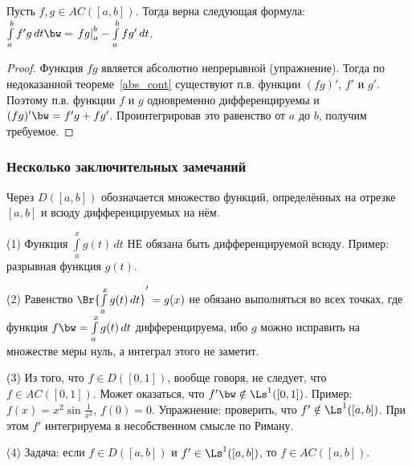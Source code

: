 \documentclass[10pt]{article}
\begin{document}
\begin{imp}
Пусть $f,g\in AC([a,b])$. Тогда верна следующая формула:
$\int\limits_a^bf'g\,dt\bw
=\left.fg\right|_a^b-\int\limits_a^bfg'\,dt$.
\end{imp}

\begin{proof}
Функция $fg$ является абсолютно непрерывной (упражнение). Тогда по
недоказанной теореме~\ref{abs_cont} существуют п.в. функции $(fg)'$,
$f'$ и $g'$. Поэтому п.в. функции $f$ и $g$ одновременно
дифференцируемы и $(fg)'\bw =f'g+fg'$. Проинтегрировав это равенство
от $a$ до $b$, получим требуемое.
\end{proof}

\subsubsection{Несколько заключительных замечаний}

Через $D([a,b])$ обозначается множество функций, определённых на
отрезке $[a,b]$ и всюду дифференцируемых на нём.

(1) Функция $\int\limits_a^xg(t)\,dt$ НЕ обязана быть
дифференцируемой всюду. Пример: разрывная функция $g(t)$.

(2) Равенство $\Br{\int\limits_a^xg(t)\,dt}'=g(x)$ не обязано
выполняться во всех точках, где функция $f\bw =
\int\limits_a^xg(t)\,dt$ дифференцируема, ибо $g$ можно исправить на
множестве меры нуль, а интеграл этого не заметит.

(3) Из того, что $f\in D([0,1])$, вообще говоря, не следует, что
$f\in AC([0,1])$. Может оказаться, что $f'\bw \notin \Ls^1([0,1])$.
Пример: $f(x)=x^2\sin\frac1{x^2}$, $f(0)=0$. Упражнение: проверить,
что $f'\notin \Ls^1([a,b])$. При этом $f'$ интегрируема в
несобственном смысле по Риману.

(4) Задача: если $f\in D([a,b])$ и $f'\in \Ls^1([a,b])$, то $f\in
AC([a,b])$.
\end{document}
